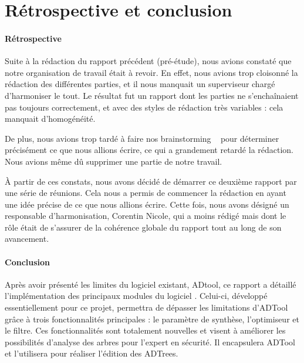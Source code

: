 \section{Rétrospective et conclusion}
	\paragraph{Rétrospective} Suite à la rédaction du rapport précédent (pré-étude), nous avions constaté que notre organisation de travail était à revoir. En effet, nous avions trop cloisonné la rédaction des différentes parties, et il nous manquait un superviseur chargé d'harmoniser le tout. Le résultat fut un rapport dont les parties ne s'enchaînaient pas toujours correctement, et avec des styles de rédaction très variables : cela manquait d'homogénéité.

	De plus, nous avions trop tardé à faire nos \og brainstorming \fg~ pour déterminer précisément ce que nous allions écrire, ce qui a grandement retardé la rédaction. Nous avions même dû supprimer une partie de notre travail.

	À partir de ces constats, nous avons décidé de démarrer ce deuxième rapport par une série de réunions. Cela nous a permis de commencer la rédaction en ayant une idée précise de ce que nous allions écrire. Cette fois, nous avons désigné un responsable d'harmonisation, Corentin {\sc Nicole}, qui a moins rédigé mais dont le rôle était de s'assurer de la cohérence globale du rapport tout au long de son avancement.

	\paragraph{Conclusion} Après avoir présenté les limites du logiciel existant, ADtool, ce rapport a détaillé l'implémentation des principaux modules du logiciel \glasir{}. Celui-ci, développé essentiellement pour ce projet, permettra de dépasser les limitations d'ADTool grâce à trois fonctionnalités principales : le paramètre de synthèse, l'optimiseur et le filtre. Ces fonctionnalités sont totalement nouvelles et visent à améliorer les possibilités d'analyse des arbres pour l'expert en sécurité. Il encapsulera ADTool et l'utilisera pour réaliser l'édition des ADTrees.


